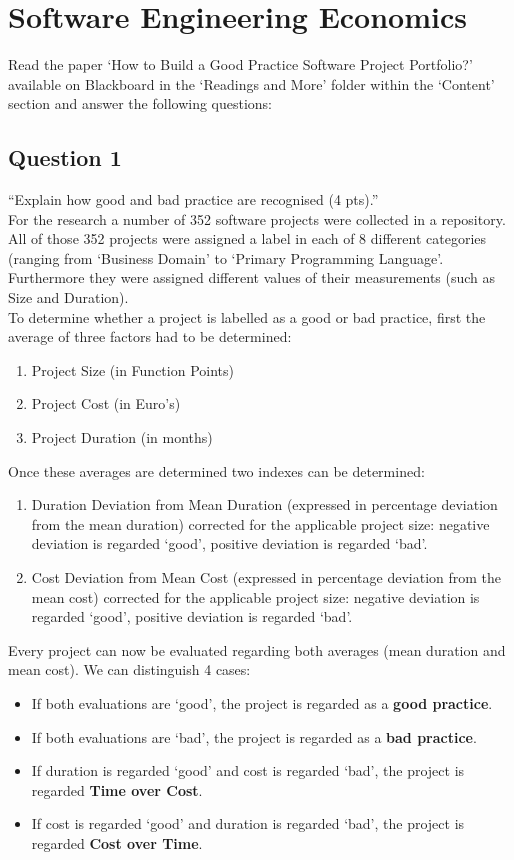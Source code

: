 \chapter{Software Engineering Economics}

Read the paper `How to Build a Good Practice Software Project Portfolio?' available on Blackboard in the `Readings and More' folder within the ‘Content’ section and answer the following questions:

\section{Question 1}
``Explain how good and bad practice are recognised (4 pts).'' \\

For the research a number of 352 software projects were collected in a repository. All of those 352 projects were assigned a label in each of 8 different categories (ranging from `Business Domain' to `Primary Programming Language'. Furthermore they were assigned different values of their measurements (such as Size and Duration). \\

To determine whether a project is labelled as a good or bad practice, first the average of three factors had to be determined:

\begin{enumerate}
	\item Project Size (in Function Points)
	\item Project Cost (in Euro's)
	\item Project Duration (in months) 
\end{enumerate} 

Once these averages are determined two indexes can be determined:

\begin{enumerate}
	\item Duration Deviation from Mean Duration (expressed in percentage deviation from the mean duration) corrected for the applicable project size: negative deviation is regarded `good', positive deviation is regarded `bad'. 
	\item Cost Deviation from Mean Cost (expressed in percentage deviation from the mean cost) corrected for the applicable project size: negative deviation is regarded `good', positive deviation is regarded `bad'. 
\end{enumerate}

Every project can now be evaluated regarding both averages (mean duration and mean cost). We can distinguish 4 cases:
\begin{itemize}
	\item If both evaluations are `good', the project is regarded as a \textbf{good practice}.
	\item If both evaluations are `bad', the project is regarded as a \textbf{bad practice}. 
	\item If duration is regarded `good' and cost is regarded `bad', the project is regarded \textbf{Time over Cost}.
	\item If cost is regarded `good' and duration is regarded `bad', the project is regarded \textbf{Cost over Time}.
\end{itemize}
 